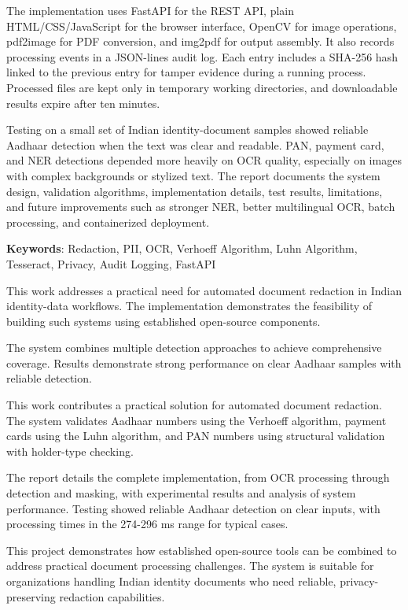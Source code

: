 The implementation uses FastAPI for the REST API, plain HTML/CSS/JavaScript for the browser interface, OpenCV for image operations, pdf2image for PDF conversion, and img2pdf for output assembly. It also records processing events in a JSON-lines audit log. Each entry includes a SHA-256 hash linked to the previous entry for tamper evidence during a running process. Processed files are kept only in temporary working directories, and downloadable results expire after ten minutes.

Testing on a small set of Indian identity-document samples showed reliable Aadhaar detection when the text was clear and readable. PAN, payment card, and NER detections depended more heavily on OCR quality, especially on images with complex backgrounds or stylized text. The report documents the system design, validation algorithms, implementation details, test results, limitations, and future improvements such as stronger NER, better multilingual OCR, batch processing, and containerized deployment.

\bigskip

\textbf{Keywords}: Redaction, PII, OCR, Verhoeff Algorithm, Luhn Algorithm, Tesseract, Privacy, Audit Logging, FastAPI

\bigskip

This work addresses a practical need for automated document redaction in Indian identity-data workflows. The implementation demonstrates the feasibility of building such systems using established open-source components.

\bigskip

The system combines multiple detection approaches to achieve comprehensive coverage. Results demonstrate strong performance on clear Aadhaar samples with reliable detection.

\bigskip

This work contributes a practical solution for automated document redaction. The system validates Aadhaar numbers using the Verhoeff algorithm, payment cards using the Luhn algorithm, and PAN numbers using structural validation with holder-type checking.

\bigskip

The report details the complete implementation, from OCR processing through detection and masking, with experimental results and analysis of system performance. Testing showed reliable Aadhaar detection on clear inputs, with processing times in the 274-296 ms range for typical cases.

\bigskip

This project demonstrates how established open-source tools can be combined to address practical document processing challenges. The system is suitable for organizations handling Indian identity documents who need reliable, privacy-preserving redaction capabilities.
